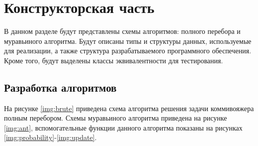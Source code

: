 \chapter{Конструкторская часть}

В данном разделе будут представлены схемы алгоритмов: полного перебора и муравьиного алгоритма. Будут описаны типы и структуры данных, используемые для реализации, а также структура разрабатываемого программного обеспечения. Кроме того, будут выделены классы эквивалентности для тестирования.

\section{Разработка алгоритмов}

На рисунке \ref{img:brute} приведена схема алгоритма решения задачи коммивояжера полным перебором. Схемы муравьиного алгоритма приведена на рисунке \ref{img:ant}, вспомогательные функции данного алгоритма показаны на рисунках \ref{img:probability}-\ref{img:update}.

